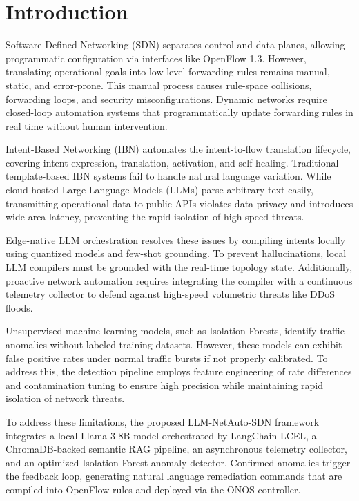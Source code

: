 \documentclass[conference]{IEEEtran}
\begin{document}
\section{Introduction}
Software-Defined Networking (SDN) separates control and data planes, allowing programmatic configuration via interfaces like OpenFlow 1.3. However, translating operational goals into low-level forwarding rules remains manual, static, and error-prone. This manual process causes rule-space collisions, forwarding loops, and security misconfigurations. Dynamic networks require closed-loop automation systems that programmatically update forwarding rules in real time without human intervention.

Intent-Based Networking (IBN) automates the intent-to-flow translation lifecycle, covering intent expression, translation, activation, and self-healing. Traditional template-based IBN systems fail to handle natural language variation. While cloud-hosted Large Language Models (LLMs) parse arbitrary text easily, transmitting operational data to public APIs violates data privacy and introduces wide-area latency, preventing the rapid isolation of high-speed threats.

Edge-native LLM orchestration resolves these issues by compiling intents locally using quantized models and few-shot grounding. To prevent hallucinations, local LLM compilers must be grounded with the real-time topology state. Additionally, proactive network automation requires integrating the compiler with a continuous telemetry collector to defend against high-speed volumetric threats like DDoS floods.

Unsupervised machine learning models, such as Isolation Forests, identify traffic anomalies without labeled training datasets. However, these models can exhibit false positive rates under normal traffic bursts if not properly calibrated. To address this, the detection pipeline employs feature engineering of rate differences and contamination tuning to ensure high precision while maintaining rapid isolation of network threats.

To address these limitations, the proposed LLM-NetAuto-SDN framework integrates a local Llama-3-8B model orchestrated by LangChain LCEL, a ChromaDB-backed semantic RAG pipeline, an asynchronous telemetry collector, and an optimized Isolation Forest anomaly detector. Confirmed anomalies trigger the feedback loop, generating natural language remediation commands that are compiled into OpenFlow rules and deployed via the ONOS controller.
\end{document}

